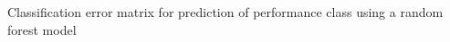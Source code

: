 Classification error matrix for prediction of performance class using a random forest model
\label{fig:performance_classification}